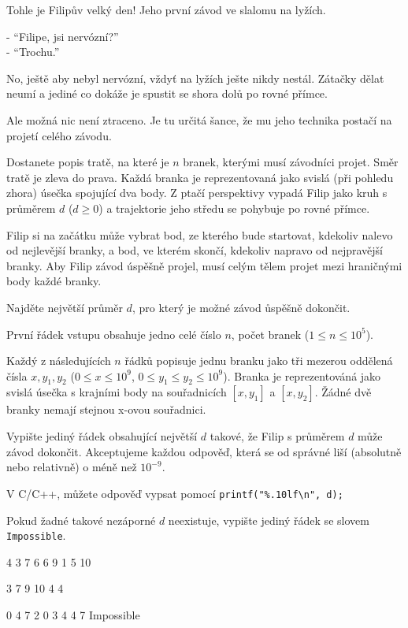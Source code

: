 





Tohle je Filipův velký den! Jeho první závod ve slalomu na lyžích.

\bigskip \noindent
- ``Filipe, jsi nervózní?''\\
- ``Trochu.''
\bigskip \noindent

No, ještě aby nebyl nervózní, vždyť na lyžích ješte nikdy nestál.
Zátačky dělat neumí a jediné co dokáže je spustit se shora dolů po rovné přímce.

Ale možná nic není ztraceno.
Je tu určitá šance, že mu jeho technika postačí na projetí celého závodu.


Dostanete popis tratě, na které je $n$ branek, kterými musí závodníci projet.
Směr tratě je zleva do prava.
Každá branka je reprezentovaná jako svislá (při pohledu zhora) úsečka spojující dva body.
Z ptačí perspektivy vypadá Filip jako kruh s průměrem $d$ ($d \geq 0$) a
trajektorie jeho středu se pohybuje po rovné přímce.

Filip si na začátku může vybrat bod, ze kterého bude startovat, kdekoliv nalevo od nejlevější branky,
a bod, ve kterém skončí, kdekoliv napravo od nejpravější branky.
Aby Filip závod úspěšně projel, musí celým tělem projet mezi hraničnými body každé branky.

Najděte největší průměr $d$, pro který je možné závod ůspěšně dokončit.



První řádek vstupu obsahuje jedno celé číslo $n$, počet branek ($1 \leq n \leq 10^5$).

Každý z následujících $n$ řádků popisuje jednu branku jako tři mezerou oddělená čísla $x, y_1, y_2$ ($0 \leq x \leq 10^9$,
$0 \leq y_1 \leq y_2 \leq 10^9$).
Branka je reprezentováná jako svislá úsečka s krajními body na souřadnicích $[x, y_1]$ a $[x, y_2]$.
Žádné dvě branky nemají stejnou x-ovou souřadnici.


Vypište jediný řádek obsahující největší $d$ takové, že Filip s průměrem $d$ může závod dokončit.
Akceptujeme každou odpověď, která se od správné liší (absolutně nebo relativně) o méně než $10^{-9}$.

V C/C++, můžete odpověď vypsat pomocí \verb!printf("%.10lf\n", d);!

Pokud žadné takové nezáporné $d$ neexistuje, vypište jediný řádek se slovem \texttt{Impossible}.



4 3 7
6 6 9
1 5 10
\sampleEND

3 7 9
10 4 4
\sampleEND

0 4 7
2 0 3
4 4 7
\sampleOUT
Impossible
\sampleEND



